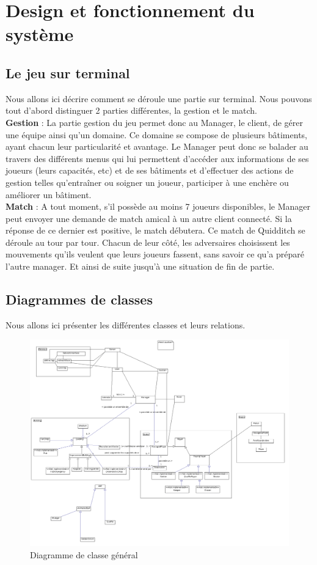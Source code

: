 \documentclass[a4paper,titlepage]{scrreprt}
\begin{document}
\section{Design et fonctionnement du système}
  \subsection{Le jeu sur terminal}
Nous allons ici décrire comment se déroule une partie sur terminal. Nous pouvons tout d'abord distinguer 2 parties différentes, la gestion et le match.\\
\textbf{Gestion} : La partie gestion du jeu permet donc au Manager, le client, de gérer une équipe ainsi qu'un domaine. Ce domaine se compose de plusieurs bâtiments, ayant chacun leur particularité et avantage. Le Manager peut donc se balader au travers des différents menus qui lui permettent d'accéder aux informations de ses joueurs (leurs capacités, etc) et de ses bâtiments et d'effectuer des actions de gestion telles qu'entraîner ou soigner un joueur, participer à une enchère ou améliorer un bâtiment. \\
\textbf{Match} : A tout moment, s'il possède au moins 7 joueurs disponibles, le Manager peut envoyer une demande de match amical à un autre client connecté. Si la réponse de ce dernier est positive, le match débutera. Ce match de Quidditch se déroule au tour par tour. Chacun de leur côté, les adversaires choisissent les mouvements qu'ils veulent que leurs joueurs fassent, sans savoir ce qu'a préparé l'autre manager. Et ainsi de suite jusqu'à une situation de fin de partie. \\

  \subsection{Diagrammes de classes}
  Nous allons ici présenter les différentes classes et leurs relations.
    \begin{figure}[H]
    \center
    \includegraphics[scale=0.3]{uml/class/Global.png}
    \caption{Diagramme de classe général}
  \end{figure}	
\end{document}

